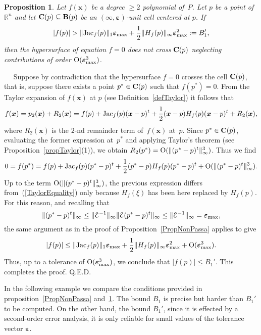 \documentclass[10pt]{article}
\newcommand\qed{{\hspace*{\fill}Q.E.D.\vskip12pt plus 1pt}}
\newcommand\sE{{\cal E}}
\newcommand{\x}{{\bm x}}
\newcommand\proof{\noindent{\em Proof.}\ \ } \newcommand\mult{\mbox{\rm mult}}
\newcommand\R{{\mathbb R}}
\newcommand{\epsbold}{{\bm \varepsilon}}
\def\Jac{\mathop{\rm Jac}\nolimits}
\newtheorem{prop}[theorem]{Proposition}
\begin{document}
\begin{prop}\label{PropNonPassa2}
Let $f(\x)$ be a degree $\geq 2$   polynomial of~$P$.
Let $p$ be a point of $\R^n$ and let
${\bf C}(p) \subseteq {\bf B}(p)$
be an $(\infty,\epsbold)$-unit cell  centered at $p$. If
$$
|f(p)| > \|{\rm Jac}_f(p)\|_1 \epsbold_{\rm max} + \frac{1}{2}  \|H_f(p)\|_\infty \epsbold_{\rm max}^2:=B_1',
$$
then  the hypersurface of equation $f=0$ does not cross ${\bf C}(p)$ neglecting contributions of order ${\rm O}(\epsbold_{\rm max} ^3)$.
\end{prop}
\proof
Suppose by contradiction that the hypersurface $f=0$ crosses  the cell
${\bf C}(p)$, that is,  suppose there exists a 
point $p^* \in {\bf C}(p)$ such that  $f(p^*)=0$.
From the Taylor expansion of $f(\x)$ at $p$ (see 
Definition~\ref{defTaylor}) it follows that
$$f(\x) =p_2(\x)+R_2(\x)= f(p) + \Jac_f(p) (\x-p)^t + \frac{1}{2}(\x-p) H_f(p) (\x-p)^t 
+R_2(\bm x),$$ where $R_2(\bm x)$ is the 
$2$-nd remainder term of~$f(\x)$ at~$p$.
Since $p^*\in {\bf C}(p)$,  evaluating the former expression at~$p^*$ and applying 
Taylor's theorem (see Proposition~\ref{propTaylor}(1)),  we obtain 
  $R_2(p^*)={\rm O}(\|(p^*-p)^t\|_{\infty}^3)$. Thus   we find
$$
0 = f(p^*) = f(p) + \Jac_f(p) (p^*-p)^t + \frac{1}{2}(p^*-p) H_f(p) (p^*-p)^t+{\rm O}(\|(p^*-p)^t\|_{\infty}^3).
$$
Up to the term ${\rm O}(\|(p^*-p)^t\|_{\infty}^3)$, the previous expression differs from~(\ref{TaylorEquality}) only because  
$H_f(\xi)$ has been here replaced by $H_f(p)$. For this reason, and recalling that
$$\|(p^*-p)^t\|_{\infty}\leq \|\sE^{-1}\|_{\infty}\|\sE (p^*-p)^t \|_{\infty}\leq \|\sE^{-1}\|_{\infty}=\epsbold_{\rm max},$$
the same argument
 as in the proof of Proposition~\ref{PropNonPassa}
applies to give
$$ |f(p)| \leq \|{\rm Jac}_f(p)\|_1 \epsbold_{\rm max} + \frac{1}{2}  \|H_f(p)\|_\infty \epsbold_{\rm max}^2+{\rm O}(\epsbold_{\rm max}^3).$$ Thus, up to a tolerance of ${\rm O}(\epsbold_{\rm max}^3)$, we conclude that $|f(p)| \leq B_1'$. This completes the proof.
 \qed 



In the following example we compare the conditions
provided in proposition~\ref{PropNonPassa} and~\ref{PropNonPassa2}. 
The bound $B_1$ is precise but harder than $B_1'$ to be computed. On the other hand, 
the bound $B_1'$, since it is effected by  a second-order 
error analysis, it is only reliable for small values of the 
tolerance vector $\epsbold$.
\end{document}
